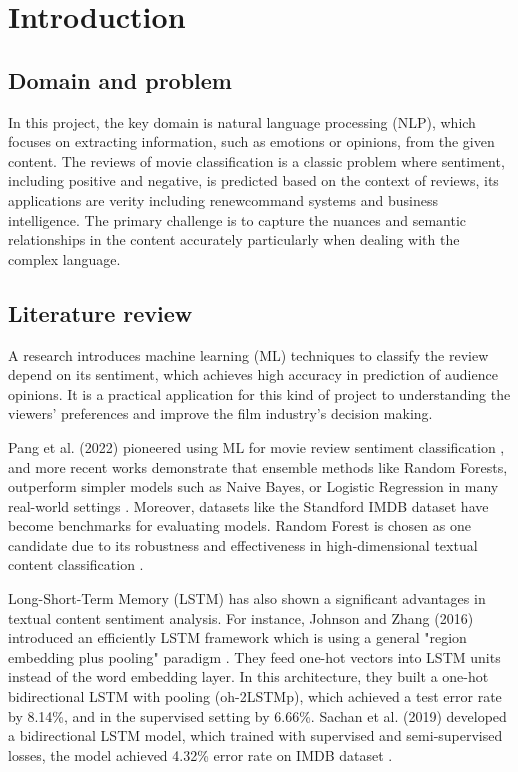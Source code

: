 \section{Introduction}

\subsection{Domain and problem}
In this project, the key domain is natural language processing (NLP), which focuses on extracting information, such as emotions or opinions, from the given content. The reviews of movie classification is a classic problem where sentiment, including positive and negative, is predicted based on the context of reviews, its applications are verity including renewcommand systems and business intelligence. The primary challenge is to capture the nuances and semantic relationships in the content accurately particularly when dealing with the complex language. 

\subsection{Literature review}
A research \cite{pang2008opinion} introduces machine learning (ML) techniques to classify the review depend on its sentiment, which achieves high accuracy in prediction of audience opinions. It is a practical application for this kind of project to understanding the viewers' preferences and improve the film industry's decision making. 

Pang et al. (2022) pioneered using ML for movie review sentiment classification \cite{pang2002thumbs}, and more recent works demonstrate that ensemble methods like Random Forests, outperform simpler models such as Naive Bayes, or Logistic Regression in many real-world settings \cite{breiman2001random,go2009twitter}. Moreover, datasets like the Standford IMDB dataset \cite{maas2011learning} have become benchmarks for evaluating models. Random Forest is chosen as one candidate due to its robustness and effectiveness in high-dimensional textual content classification \cite{kowsari2019text}. 

Long-Short-Term Memory (LSTM) has also shown a significant advantages in textual content sentiment analysis. For instance, Johnson and Zhang (2016) introduced an efficiently LSTM framework which is using a general "region embedding plus pooling" paradigm \cite{johnson2016supervised}. They feed one-hot vectors into LSTM units instead of the word embedding layer. In this architecture, they built a one-hot bidirectional LSTM with pooling (oh-2LSTMp), which achieved a test error rate by 8.14\%, and in the supervised setting by 6.66\%. Sachan et al. (2019) developed a bidirectional LSTM model, which trained with supervised and semi-supervised losses, the model achieved 4.32\% error rate on IMDB dataset \cite{sachan2019revisiting}.

